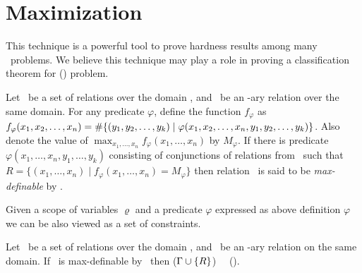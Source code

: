 \section{Maximization}
This technique is a powerful tool to prove hardness results among many \ccsp\ problems.
We believe this technique may play a role in proving a classification theorem for \ccsp(\mrelset)
problem.

\begin{defi}\label{def:max}
Let \mrelset\ be a set of relations over the domain \mD,
and \mR\ be an \mn-ary relation over the same domain. 
For any predicate \(\varphi\), define the function
\(f_\varphi\) as \(f_\varphi(x_1,x_2,\dotsc,x_n)=\#\{{(y_1,y_2,\dotsc,y_k) \mid
\varphi(x_1,x_2,\dotsc,x_n,y_1,y_2,\dotsc,y_k)}\}\)\@. Also denote the value of
\(\max_{x_1,\dotsc,x_n} f_\varphi(x_1,\dotsc,x_n)\) by \(M_\varphi\)\@.
If there is predicate \(\varphi(x_1,\dotsc,x_n,y_1,\dotsc,y_k)\) 
consisting of conjunctions of relations from \mrelset\ such that
 \(R=\{(x_1,\dotsc,x_n) \mid f_\varphi(x_1,\dotsc,x_n) = M_\varphi\}\) then
relation \mR\ is said to be \emph{max-definable} by \mrelset\@.
\end{defi} 

Given a scope of variables \(\varrho\) and a predicate \(\varphi\) expressed as above definition
\(\varphi\) we can be also viewed as a set of constraints.

\begin{theorem}[Maximization]\label{theo:max}
Let \mrelset\ be a set of relations over the domain \mD,
and \mR\ be an \mn-ary relation on the same domain. 
If \mR\ is max-definable by \mrelset\ then \ccsp(\(\Gamma \cup \{{R}\}\))~\maple~
\ccsp(\mrelset)\@.
\end{theorem}

